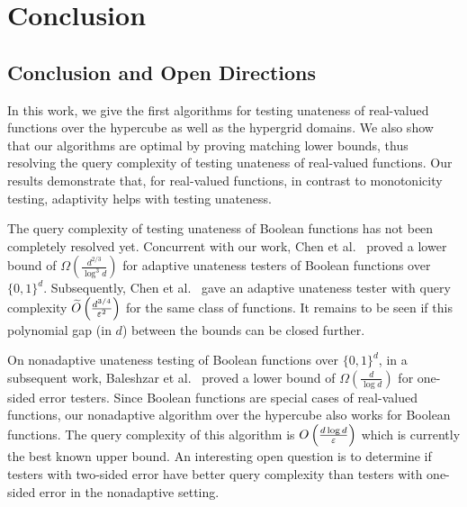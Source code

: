 \chapter{Conclusion}

\section{Conclusion and Open Directions}
In this work, we give the first algorithms for 
testing unateness of real-valued functions over the hypercube as well as the hypergrid domains.
We also show that our algorithms are optimal by proving matching lower bounds, thus resolving the query complexity of testing unateness of real-valued functions.
Our results demonstrate that, for real-valued functions, in contrast to monotonicity testing, adaptivity helps with testing unateness. 

The query complexity of testing unateness of Boolean functions has not been completely resolved yet.
Concurrent with our work, Chen et al.~\cite{CWX17} proved a lower bound of $\Omega\left(\frac{d^{2/3}}{\log^3 d} \right)$ for adaptive unateness testers of Boolean functions over $\{0,1\}^d$.
Subsequently, Chen et al.~\cite{CWX17focs} gave an adaptive unateness tester with query complexity $\widetilde{O}\left(\frac{d^{3/4}}{\varepsilon^2}\right)$ for the same class of functions.
It remains to be seen if this polynomial gap (in $d$) between the bounds can be closed further.

On nonadaptive unateness testing of Boolean functions over $\{0,1\}^d$, in a subsequent work, Baleshzar et al.~\cite{BCPRS17b} proved a lower bound of $\Omega\left(\frac{d}{\log d} \right)$ for one-sided error testers.
Since Boolean functions are special cases of real-valued functions, 
our nonadaptive algorithm over the hypercube also works for Boolean functions.
The query complexity of this algorithm is $O\left(\frac{d \log d}{\varepsilon}\right)$ which is currently the best known upper bound.
An interesting open question is to determine if testers with two-sided error have better query complexity than testers with one-sided error in the nonadaptive setting. 
